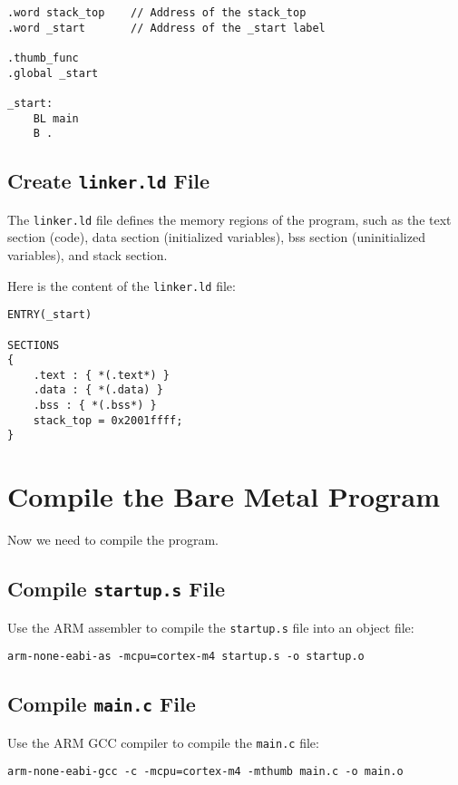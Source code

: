 \begin{lstlisting}
.word stack_top    // Address of the stack_top
.word _start       // Address of the _start label

.thumb_func 
.global _start

_start:
    BL main
    B .
\end{lstlisting}

\subsection*{Create \texttt{linker.ld} File}

The \texttt{linker.ld} file defines the memory regions of the program, such as the text section (code), data section (initialized variables), bss section (uninitialized variables), and stack section.

Here is the content of the \texttt{linker.ld} file:

\begin{lstlisting}
ENTRY(_start)

SECTIONS
{
    .text : { *(.text*) }        
    .data : { *(.data) }
    .bss : { *(.bss*) }
    stack_top = 0x2001ffff; 
}
\end{lstlisting}

\section*{Compile the Bare Metal Program}

Now we need to compile the program.

\subsection*{Compile \texttt{startup.s} File}

Use the ARM assembler to compile the \texttt{startup.s} file into an object file:

\begin{lstlisting}
arm-none-eabi-as -mcpu=cortex-m4 startup.s -o startup.o
\end{lstlisting}

\subsection*{Compile \texttt{main.c} File}

Use the ARM GCC compiler to compile the \texttt{main.c} file:

\begin{lstlisting}
arm-none-eabi-gcc -c -mcpu=cortex-m4 -mthumb main.c -o main.o
\end{lstlisting}

